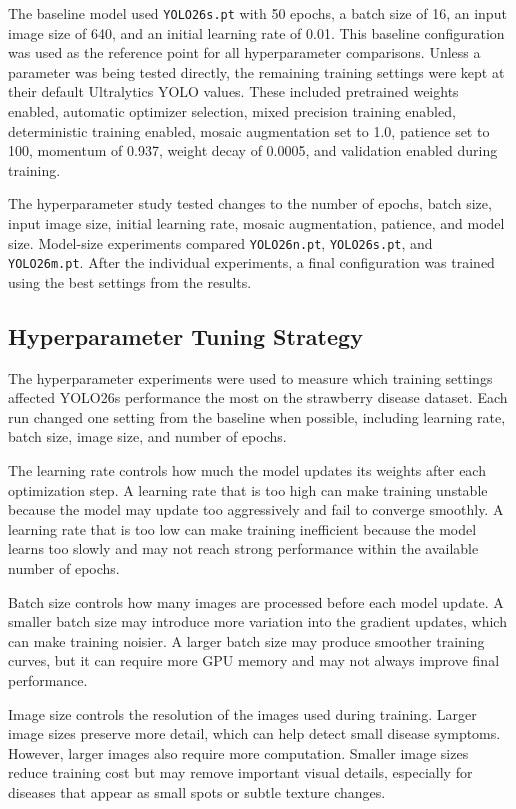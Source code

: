 \documentclass[10pt,twocolumn,letterpaper]{article}
\begin{document}
The baseline model used \texttt{YOLO26s.pt} with 50 epochs, a batch size of 16, an input image size of 640, and an initial learning rate of 0.01. This baseline configuration was used as the reference point for all hyperparameter comparisons. Unless a parameter was being tested directly, the remaining training settings were kept at their default Ultralytics YOLO values. These included pretrained weights enabled, automatic optimizer selection, mixed precision training enabled, deterministic training enabled, mosaic augmentation set to 1.0, patience set to 100, momentum of 0.937, weight decay of 0.0005, and validation enabled during training.

The hyperparameter study tested changes to the number of epochs, batch size, input image size, initial learning rate, mosaic augmentation, patience, and model size. Model-size experiments compared \texttt{YOLO26n.pt}, \texttt{YOLO26s.pt}, and \texttt{YOLO26m.pt}. After the individual experiments, a final configuration was trained using the best settings from the results.

\subsection{Hyperparameter Tuning Strategy}

The hyperparameter experiments were used to measure which training settings affected YOLO26s performance the most on the strawberry disease dataset. Each run changed one setting from the baseline when possible, including learning rate, batch size, image size, and number of epochs.

The learning rate controls how much the model updates its weights after each optimization step. A learning rate that is too high can make training unstable because the model may update too aggressively and fail to converge smoothly. A learning rate that is too low can make training inefficient because the model learns too slowly and may not reach strong performance within the available number of epochs.

Batch size controls how many images are processed before each model update. A smaller batch size may introduce more variation into the gradient updates, which can make training noisier. A larger batch size may produce smoother training curves, but it can require more GPU memory and may not always improve final performance.

Image size controls the resolution of the images used during training. Larger image sizes preserve more detail, which can help detect small disease symptoms. However, larger images also require more computation. Smaller image sizes reduce training cost but may remove important visual details, especially for diseases that appear as small spots or subtle texture changes.
\end{document}
